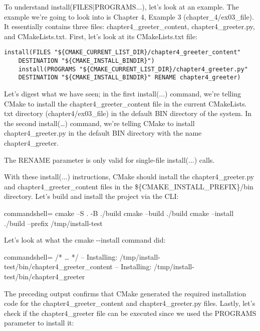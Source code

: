 To understand install(FILES|PROGRAMS...), let's look at an example. The example we're going to look into is Chapter 4, Example 3 (chapter\_4/ex03\_file). It essentially contains three files: chapter4\_greeter\_content, chapter4\_greeter.py, and CMakeLists.txt. First, let's look at its CMakeLists.txt file:

\begin{lstlisting}[style=styleCMake]
install(FILES "${CMAKE_CURRENT_LIST_DIR}/chapter4_greeter_content"
	DESTINATION "${CMAKE_INSTALL_BINDIR}")
	install(PROGRAMS "${CMAKE_CURRENT_LIST_DIR}/chapter4_greeter.py"
	DESTINATION "${CMAKE_INSTALL_BINDIR}" RENAME chapter4_greeter)
\end{lstlisting}

Let's digest what we have seen; in the first install(...) command, we're telling CMake to install the chapter4\_greeter\_content file in the current CMakeLists. txt directory (chapter4/ex03\_file) in the default BIN directory of the system. In the second install(…) command, we're telling CMake to install chapter4\_greeter.py in the default BIN directory with the name chapter4\_greeter.

\begin{tcolorbox}[colback=webgreen!5!white,colframe=webgreen!75!black,title=Note]
The RENAME parameter is only valid for single-file install(...) calls.
\end{tcolorbox}

With these install(...) instructions, CMake should install the chapter4\_greeter.py and chapter4\_greeter\_content files in the \$\{CMAKE\_INSTALL\_PREFIX\}/bin directory. Let's build and install the project via the CLI:

\begin{tcblisting}{commandshell={}}
cmake –S . -B ./build
cmake --build ./build
cmake --install ./build --prefix /tmp/install-test
\end{tcblisting}

Let's look at what the cmake -{}-install command did:

\begin{tcblisting}{commandshell={}}
/* … */
-- Installing: /tmp/install-test/bin/chapter4_greeter_content
-- Installing: /tmp/install-test/bin/chapter4_greeter
\end{tcblisting}

The preceding output confirms that CMake generated the required installation code for the chapter4\_greeter\_content and chapter4\_greeter.py files. Lastly, let's check if the chapter4\_greeter file can be executed since we used the PROGRAMS parameter to install it:

